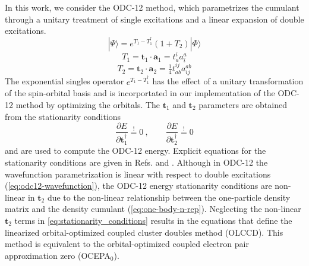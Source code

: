 In this work, we consider the ODC-12
method,\cite{Sokolov:2013p024107,Sokolov:2013p204110} which parametrizes the
cumulant through a unitary treatment of single excitations and a linear
expansion of double excitations.
\begin{equation}
    \label{eq:odc12-wavefunction}
    |\Psi\rangle
    =
    e^{T_1-T_1^\dagger}
    (1 + T_2)
    |\Phi\rangle
\end{equation}
\begin{equation}
    T_1
    =
    \mathbf{t}_1\cdot\mathbf{a}_1
    =
    t_a^i
    a^a_i
\end{equation}
\begin{equation}
    T_2
    =
    \mathbf{t}_2\cdot\mathbf{a}_2
    =
    \tfrac{1}{4}
    t_{ab}^{ij}
    a^{ab}_{ij}
\end{equation}
The exponential singles operator \(e^{T_1-T_1^\dagger}\) has the effect of a
unitary transformation of the spin-orbital basis and is incorportated in our
implementation of the ODC-12 method by optimizing the
orbitals.\cite{Sokolov:2013p204110}
The \(\mathbf{t}_1\) and \(\mathbf{t}_2\) parameters are obtained from the
stationarity conditions
\begin{equation}
    \label{eq:stationarity_conditions}
    \dfrac{\partial E}{\partial \mathbf{t}_1^\dagger}
    \overset{!}{=}
    0 \ ,
    \qquad
    \dfrac{\partial E}{\partial \mathbf{t}_2^\dagger}
    \overset{!}{=}
    0
\end{equation}
and are used to compute the ODC-12 energy.
Explicit equations for the stationarity conditions are given in Refs.\@
{} and .
Although in ODC-12 the wavefunction parametrization is linear with respect
to double excitations (\cref{eq:odc12-wavefunction}), the ODC-12 energy
stationarity conditions are non-linear in $\mathbf{t}_2$ due to the non-linear
relationship between the one-particle density matrix and the density cumulant
(\cref{eq:one-body-n-rep}).\cite{Sokolov:2013p024107} Neglecting the non-linear
$\mathbf{t}_2$ terms in \cref{eq:stationarity_conditions} results in the
equations that define the linearized orbital-optimized  coupled cluster doubles
method (OLCCD).
This method is equivalent to the orbital-optimized coupled electron pair
approximation zero (OCEPA$_0$).\cite{Bozkaya:2013p054104}
